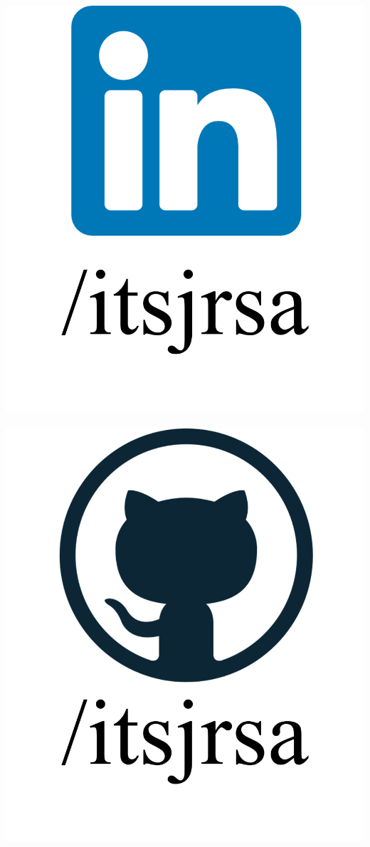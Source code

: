 \documentclass{mycv}
\begin{document}
\begin{center}
	
	\href{https://www.linkedin.com/in/itsjrsa}{\includegraphics[scale=0.055]{figs/linkedin_logo_label.png}}
	\ \ \ \ \ \
	\href{https://github.com/itsjrsa}{\includegraphics[scale=0.055]{figs/github_logo_label.png}}
	
\end{center}
\end{document}
